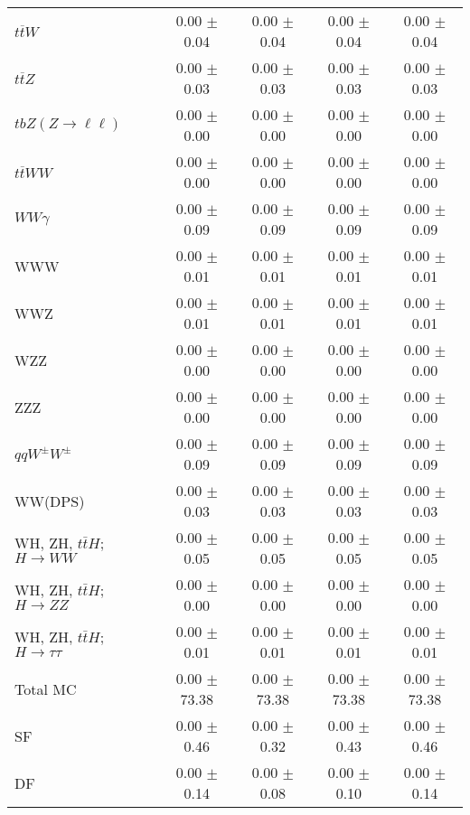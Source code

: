 \begin{tabular}{l|cccc}
                   $t\overline{t}W$ &  0.00 $\pm$  0.04 &  0.00 $\pm$  0.04 &  0.00 $\pm$  0.04 &  0.00 $\pm$  0.04 \\
                   $t\overline{t}Z$ &  0.00 $\pm$  0.03 &  0.00 $\pm$  0.03 &  0.00 $\pm$  0.03 &  0.00 $\pm$  0.03 \\
    $tbZ (Z \rightarrow \ell \ell)$ &  0.00 $\pm$  0.00 &  0.00 $\pm$  0.00 &  0.00 $\pm$  0.00 &  0.00 $\pm$  0.00 \\
                  $t\overline{t}WW$ &  0.00 $\pm$  0.00 &  0.00 $\pm$  0.00 &  0.00 $\pm$  0.00 &  0.00 $\pm$  0.00 \\
                         $WW\gamma$ &  0.00 $\pm$  0.09 &  0.00 $\pm$  0.09 &  0.00 $\pm$  0.09 &  0.00 $\pm$  0.09 \\
                                WWW &  0.00 $\pm$  0.01 &  0.00 $\pm$  0.01 &  0.00 $\pm$  0.01 &  0.00 $\pm$  0.01 \\
                                WWZ &  0.00 $\pm$  0.01 &  0.00 $\pm$  0.01 &  0.00 $\pm$  0.01 &  0.00 $\pm$  0.01 \\
                                WZZ &  0.00 $\pm$  0.00 &  0.00 $\pm$  0.00 &  0.00 $\pm$  0.00 &  0.00 $\pm$  0.00 \\
                                ZZZ &  0.00 $\pm$  0.00 &  0.00 $\pm$  0.00 &  0.00 $\pm$  0.00 &  0.00 $\pm$  0.00 \\
                 $qqW^{\pm}W^{\pm}$ &  0.00 $\pm$  0.09 &  0.00 $\pm$  0.09 &  0.00 $\pm$  0.09 &  0.00 $\pm$  0.09 \\
                            WW(DPS) &  0.00 $\pm$  0.03 &  0.00 $\pm$  0.03 &  0.00 $\pm$  0.03 &  0.00 $\pm$  0.03 \\
WH, ZH, $t\bar{t}H$; $H \rightarrow WW$ &  0.00 $\pm$  0.05 &  0.00 $\pm$  0.05 &  0.00 $\pm$  0.05 &  0.00 $\pm$  0.05 \\
WH, ZH, $t\bar{t}H$; $H \rightarrow ZZ$ &  0.00 $\pm$  0.00 &  0.00 $\pm$  0.00 &  0.00 $\pm$  0.00 &  0.00 $\pm$  0.00 \\
WH, ZH, $t\bar{t}H$; $H \rightarrow \tau\tau$ &  0.00 $\pm$  0.01 &  0.00 $\pm$  0.01 &  0.00 $\pm$  0.01 &  0.00 $\pm$  0.01 \\
\hline\hline
                           Total MC &  0.00 $\pm$ 73.38 &  0.00 $\pm$ 73.38 &  0.00 $\pm$ 73.38 &  0.00 $\pm$ 73.38 \\
\hline
                                 SF &  0.00 $\pm$  0.46 &  0.00 $\pm$  0.32 &  0.00 $\pm$  0.43 &  0.00 $\pm$  0.46 \\
                                 DF &  0.00 $\pm$  0.14 &  0.00 $\pm$  0.08 &  0.00 $\pm$  0.10 &  0.00 $\pm$  0.14 \\

\end{tabular}
